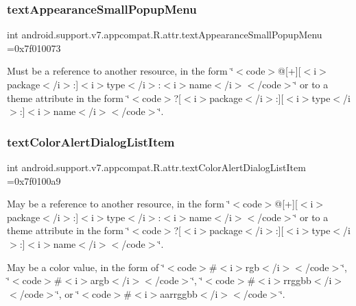 \subsubsection{\texorpdfstring{text\+Appearance\+Small\+Popup\+Menu}{textAppearanceSmallPopupMenu}}
{\footnotesize\ttfamily int android.\+support.\+v7.\+appcompat.\+R.\+attr.\+text\+Appearance\+Small\+Popup\+Menu =0x7f010073\hspace{0.3cm}{\ttfamily [static]}}

Must be a reference to another resource, in the form \char`\"{}$<$code$>$@\mbox{[}+\mbox{]}\mbox{[}$<$i$>$package$<$/i$>$\+:\mbox{]}$<$i$>$type$<$/i$>$\+:$<$i$>$name$<$/i$>$$<$/code$>$\char`\"{} or to a theme attribute in the form \char`\"{}$<$code$>$?\mbox{[}$<$i$>$package$<$/i$>$\+:\mbox{]}\mbox{[}$<$i$>$type$<$/i$>$\+:\mbox{]}$<$i$>$name$<$/i$>$$<$/code$>$\char`\"{}. \mbox{\label{classandroid_1_1support_1_1v7_1_1appcompat_1_1R_1_1attr_acf3e75d2d1ef8b122de63bc41fbd2edb}} 
\subsubsection{\texorpdfstring{text\+Color\+Alert\+Dialog\+List\+Item}{textColorAlertDialogListItem}}
{\footnotesize\ttfamily int android.\+support.\+v7.\+appcompat.\+R.\+attr.\+text\+Color\+Alert\+Dialog\+List\+Item =0x7f0100a9\hspace{0.3cm}{\ttfamily [static]}}

May be a reference to another resource, in the form \char`\"{}$<$code$>$@\mbox{[}+\mbox{]}\mbox{[}$<$i$>$package$<$/i$>$\+:\mbox{]}$<$i$>$type$<$/i$>$\+:$<$i$>$name$<$/i$>$$<$/code$>$\char`\"{} or to a theme attribute in the form \char`\"{}$<$code$>$?\mbox{[}$<$i$>$package$<$/i$>$\+:\mbox{]}\mbox{[}$<$i$>$type$<$/i$>$\+:\mbox{]}$<$i$>$name$<$/i$>$$<$/code$>$\char`\"{}. 

May be a color value, in the form of \char`\"{}$<$code$>$\#$<$i$>$rgb$<$/i$>$$<$/code$>$\char`\"{}, \char`\"{}$<$code$>$\#$<$i$>$argb$<$/i$>$$<$/code$>$\char`\"{}, \char`\"{}$<$code$>$\#$<$i$>$rrggbb$<$/i$>$$<$/code$>$\char`\"{}, or \char`\"{}$<$code$>$\#$<$i$>$aarrggbb$<$/i$>$$<$/code$>$\char`\"{}. \mbox{\label{classandroid_1_1support_1_1v7_1_1appcompat_1_1R_1_1attr_abd277e699c01cd80ea57d1e4e881df22}} 
